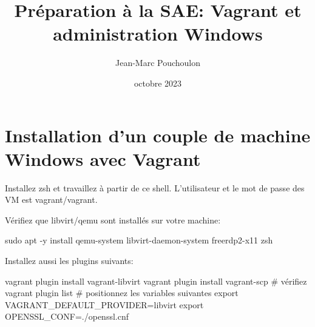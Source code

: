 

\usepackage{titlepic}
\title{Préparation à la SAE: Vagrant et administration Windows}

\date{octobre 2023}

\noprintanswers

\usepackage{graphicx}
\graphicspath{{./images/}}


\author{Jean-Marc Pouchoulon}




\maketitle

\section{Installation d'un couple de machine Windows avec Vagrant}

Installez zsh et travaillez à partir de ce shell.
L'utilisateur et le mot de passe des VM est vagrant/vagrant.

Vérifiez que libvirt/qemu sont installés sur votre machine:
\begin{bashcode}
sudo apt -y install qemu-system libvirt-daemon-system freerdp2-x11 zsh
\end{bashcode}

Installez aussi les plugins suivants:
\begin{bashcode}
vagrant plugin install vagrant-libvirt
vagrant plugin install vagrant-scp 
# vérifiez
vagrant plugin list
# positionnez les variables suivantes 
export VAGRANT_DEFAULT_PROVIDER=libvirt 
export OPENSSL_CONF=./openssl.cnf
\end{bashcode}

